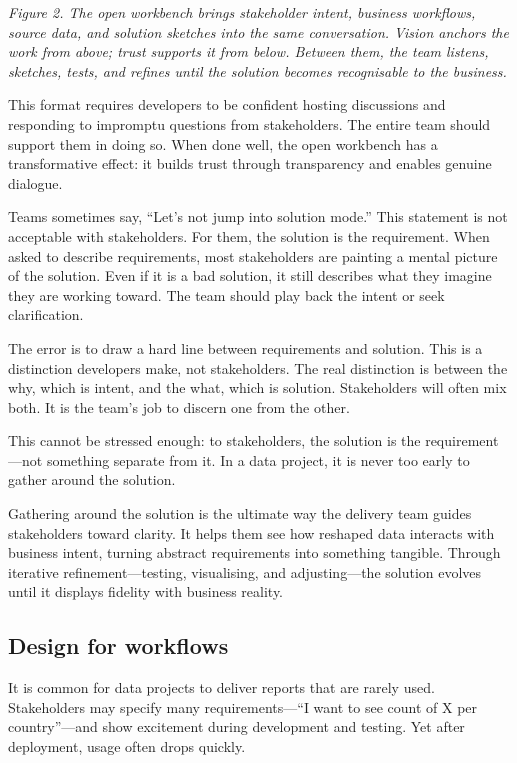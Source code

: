 \documentclass[10pt,openany,10pt]{book}
\begin{document}
\emph{Figure 2. The open workbench brings stakeholder intent, business
workflows, source data, and solution sketches into the same
conversation. Vision anchors the work from above; trust supports it from
below. Between them, the team listens, sketches, tests, and refines
until the solution becomes recognisable to the business.}

This format requires developers to be confident hosting discussions and
responding to impromptu questions from stakeholders. The entire team
should support them in doing so. When done well, the open workbench has
a transformative effect: it builds trust through transparency and
enables genuine dialogue.

Teams sometimes say, ``Let's not jump into solution mode.'' This
statement is not acceptable with stakeholders. For them, the solution is
the requirement. When asked to describe requirements, most stakeholders
are painting a mental picture of the solution. Even if it is a bad
solution, it still describes what they imagine they are working toward.
The team should play back the intent or seek clarification.

The error is to draw a hard line between requirements and solution. This
is a distinction developers make, not stakeholders. The real distinction
is between the why, which is intent, and the what, which is solution.
Stakeholders will often mix both. It is the team's job to discern one
from the other.

This cannot be stressed enough: to stakeholders, the solution is the
requirement---not something separate from it. In a data project, it is
never too early to gather around the solution.

Gathering around the solution is the ultimate way the delivery team
guides stakeholders toward clarity. It helps them see how reshaped data
interacts with business intent, turning abstract requirements into
something tangible. Through iterative refinement---testing, visualising,
and adjusting---the solution evolves until it displays fidelity with
business reality.

\subsection{Design for workflows}\label{design-for-workflows}

It is common for data projects to deliver reports that are rarely used.
Stakeholders may specify many requirements---``I want to see count of X
per country''---and show excitement during development and testing. Yet
after deployment, usage often drops quickly.
\end{document}
